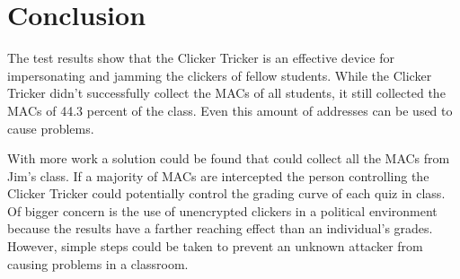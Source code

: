 


\section{Conclusion}

The test results show that the Clicker Tricker is an effective device for impersonating and jamming the clickers of fellow students.  While the Clicker Tricker didn't successfully collect the MACs of all students, it still collected the MACs of 44.3 percent of the class.  Even this amount of addresses can be used to cause problems.

With more work a solution could be found that could collect all the MACs from Jim's class.  If a majority of MACs are intercepted the person controlling the Clicker Tricker could potentially control the grading curve of each quiz in class.  Of bigger concern is the use of unencrypted clickers in a political environment because the results have a farther reaching effect than an individual's grades.
However, simple steps could be taken to prevent an unknown attacker from causing problems in a classroom.

